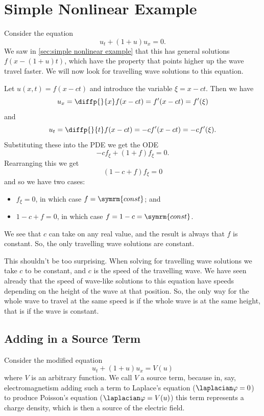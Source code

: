 \documentclass[fleqn]{NotesClass}
\newcommand{\const}{\symrm{const}}
\begin{document}
    \section{Simple Nonlinear Example}
    Consider the equation
    \begin{equation}
        u_t + (1 + u)u_x = 0.
    \end{equation}
    We saw in \cref{sec:simple nonlinear example} that this has general solutions \(f(x - (1 + u)t)\), which have the property that points higher up the wave travel faster.
    We will now look for travelling wave solutions to this equation.
    
    Let \(u(x, t) = f(x - ct)\) and introduce the variable \(\xi = x - ct\).
    Then we have
    \begin{equation}
        u_x = \diffp{}{x} f(x - ct) = f'(x - ct) = f'(\xi)
    \end{equation}
    and
    \begin{equation}
        u_t = \diffp{}{t} f(x - ct) = -cf'(x - ct) = -cf'(\xi).
    \end{equation}
    Substituting these into the PDE we get the ODE
    \begin{equation}
        -cf_\xi + (1 + f)f_\xi = 0. 
    \end{equation}
    Rearranging this we get
    \begin{equation}
        (1 - c + f)f_\xi = 0
    \end{equation}
    and so we have two cases:
    \begin{itemize}
        \item \(f_\xi = 0\), in which case \(f = \const\); and
        \item \(1 - c + f = 0\), in which case \(f = 1 - c = \const\).
    \end{itemize}
    We see that \(c\) can take on any real value, and the result is always that \(f\) is constant.
    So, the only travelling wave solutions are constant.
    
    This shouldn't be too surprising.
    When solving for travelling wave solutions we take \(c\) to be constant, and \(c\) is the speed of the travelling wave.
    We have seen already that the speed of wave-like solutions to this equation have speeds depending on the height of the wave at that position.
    So, the only way for the whole wave to travel at the same speed is if the whole wave is at the same height, that is if the wave is constant.
    
    \subsection{Adding in a Source Term}
    Consider the modified equation
    \begin{equation}
        u_t + (1 + u)u_x = V(u)
    \end{equation}
    where \(V\) is an arbitrary function.
    We call \(V\) a source term, because in, say, electromagnetism adding such a term to Laplace's equation (\(\laplacian \varphi = 0\)) to produce Poisson's equation (\(\laplacian \varphi = V(u)\)) this term represents a charge density, which is then a source of the electric field.
    
\end{document}

